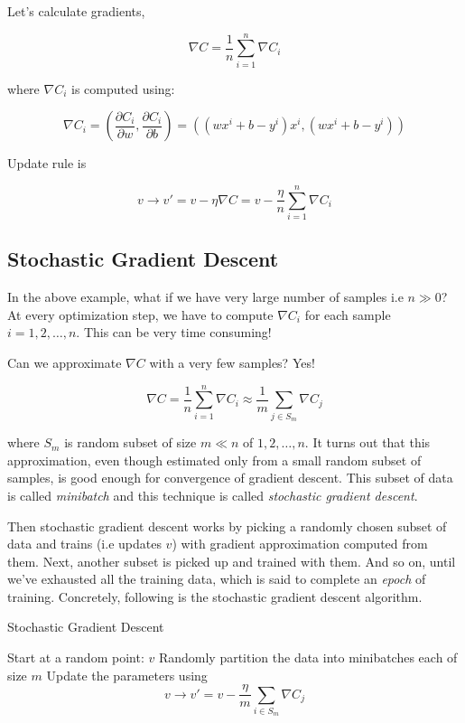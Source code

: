 \documentclass[a4paper]{tufte-handout}
\begin{document}
Let's calculate gradients,

\[ \nabla C = \frac{1}{n} \sum_{i = 1}^{n} \nabla C_i \]

where \(\nabla C_i\) is computed using:

\[ \nabla C_i = \left( \frac{\partial C_i}{\partial w}, \frac{\partial C_i}{\partial b}  \right) = \left( (wx^i + b - y^i)x^i, (wx^i + b - y^i) \right)\]

Update rule is

\[ v \rightarrow v' = v -\eta \nabla C = v -\frac{\eta}{n} \sum_{i = 1}^{n} \nabla C_i \]


\subsection{Stochastic Gradient Descent}\label{stochastic-gradient-descent}

In the above example, what if we have very large number of samples i.e
\(n \gg 0\)? At every optimization step, we have to compute
\(\nabla C_i\) for each sample \(i = 1, 2, \ldots, n\). This can be very
time consuming!

Can we approximate \(\nabla C\) with a very few samples? Yes!

\[ \nabla C = \frac{1}{n} \sum_{i = 1}^{n} \nabla C_i \approx \frac{1}{m} \sum_{j \in S_m} \nabla C_j \]

where \(S_m\) is random subset of size \(m \ll n\) of
\({1, 2, \ldots,n}\). It turns out that this approximation, even though
estimated only from a small random subset of samples, is good enough for
convergence of gradient descent. This subset of data is called
\emph{minibatch} and this technique is called \emph{stochastic gradient
descent}.

Then stochastic gradient descent works by picking a randomly chosen
subset of data and trains (i.e updates \(v\)) with gradient
approximation computed from them. Next, another subset is picked up and
trained with them. And so on, until we've exhausted all the training
data, which is said to complete an \emph{epoch} of training. Concretely,
following is the stochastic gradient descent algorithm.

\begin{algorithm}
\caption{Stochastic Gradient Descent}
\begin{algorithmic}[1]
  \STATE Start at a random point: \(v\)
      \STATE Randomly partition the data into minibatches each of size $m$ 
        \STATE Update the parameters using \[v \rightarrow v' = v -\frac{\eta}{m} \sum_{i \in S_m} \nabla C_j\]
      \ENDFOR
  \ENDFOR
\end{algorithmic}
\end{algorithm}
\end{document}

